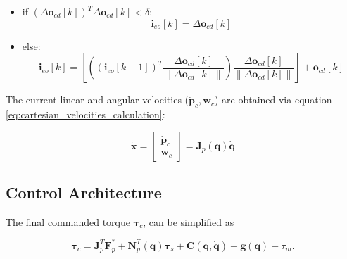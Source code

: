 \begin{itemize}
    \item if $(\Delta \boldsymbol{o}_{cd}[k])^T \Delta \boldsymbol{o}_{cd}[k] < \delta$:
        \begin{equation}
            \boldsymbol{i}_{eo}[k] = \Delta \boldsymbol{o}_{cd}[k]
        \end{equation}
        
    \item else:
        \begin{equation}
            \boldsymbol{i}_{eo}[k] = \left[ \left( (\boldsymbol{i}_{eo}[k-1])^T \frac{\Delta \boldsymbol{o}_{cd}[k]}{\| \Delta \boldsymbol{o}_{cd}[k] \|} \right) \frac{\Delta \boldsymbol{o}_{cd}[k]}{\| \Delta \boldsymbol{o}_{cd}[k] \|} \right] + \boldsymbol{o}_{cd}[k]
        \end{equation}
\end{itemize}

The current linear and angular velocities ($\boldsymbol{\dot{p}}_c, \boldsymbol{w}_c$) are obtained via equation \ref{eq:cartesian_velocities_calculation}:

\begin{equation}
    \label{eq:cartesian_velocities_calculation}
    \boldsymbol{\dot{x}} = \begin{bmatrix}
        \boldsymbol{\dot{p}}_c\\
        \boldsymbol{w}_c
    \end{bmatrix} = \boldsymbol{J}_p(\boldsymbol{q}) \boldsymbol{\dot{q}}
\end{equation}


\subsection{Control Architecture}
\label{subsec:control_architectures_cartesian_impedance_posture_optimisation_architecture}

The final commanded torque $\boldsymbol{\tau}_c$, can be simplified as

\begin{equation}
    \boldsymbol{\tau}_c = \boldsymbol{J}^T_p \boldsymbol{F}^*_p + \boldsymbol{N}^T_p(\boldsymbol{q}) \boldsymbol{\tau}_s + \boldsymbol{C}(\boldsymbol{q}, \boldsymbol{\dot{q}}) + \boldsymbol{g}(\boldsymbol{q}) - \tau_m.
\end{equation}

